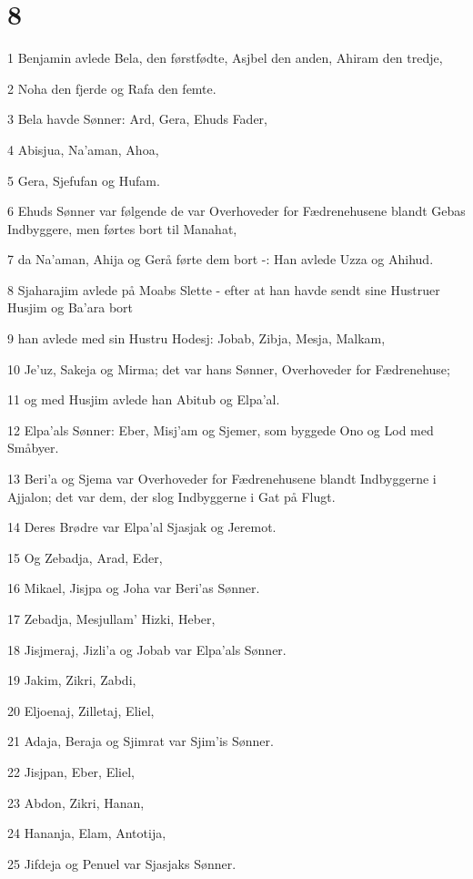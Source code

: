 \chapter{8}

\par 1 Benjamin avlede Bela, den førstfødte, Asjbel den anden, Ahiram den tredje,
\par 2 Noha den fjerde og Rafa den femte.
\par 3 Bela havde Sønner: Ard, Gera, Ehuds Fader,
\par 4 Abisjua, Na'aman, Ahoa,
\par 5 Gera, Sjefufan og Hufam.
\par 6 Ehuds Sønner var følgende de var Overhoveder for Fædrenehusene blandt Gebas Indbyggere, men førtes bort til Manahat,
\par 7 da Na'aman, Ahija og Gerå førte dem bort -: Han avlede Uzza og Ahihud.
\par 8 Sjaharajim avlede på Moabs Slette - efter at han havde sendt sine Hustruer Husjim og Ba'ara bort
\par 9 han avlede med sin Hustru Hodesj: Jobab, Zibja, Mesja, Malkam,
\par 10 Je'uz, Sakeja og Mirma; det var hans Sønner, Overhoveder for Fædrenehuse;
\par 11 og med Husjim avlede han Abitub og Elpa'al.
\par 12 Elpa'als Sønner: Eber, Misj'am og Sjemer, som byggede Ono og Lod med Småbyer.
\par 13 Beri'a og Sjema var Overhoveder for Fædrenehusene blandt Indbyggerne i Ajjalon; det var dem, der slog Indbyggerne i Gat på Flugt.
\par 14 Deres Brødre var Elpa'al Sjasjak og Jeremot.
\par 15 Og Zebadja, Arad, Eder,
\par 16 Mikael, Jisjpa og Joha var Beri'as Sønner.
\par 17 Zebadja, Mesjullam' Hizki, Heber,
\par 18 Jisjmeraj, Jizli'a og Jobab var Elpa'als Sønner.
\par 19 Jakim, Zikri, Zabdi,
\par 20 Eljoenaj, Zilletaj, Eliel,
\par 21 Adaja, Beraja og Sjimrat var Sjim'is Sønner.
\par 22 Jisjpan, Eber, Eliel,
\par 23 Abdon, Zikri, Hanan,
\par 24 Hananja, Elam, Antotija,
\par 25 Jifdeja og Penuel var Sjasjaks Sønner.
